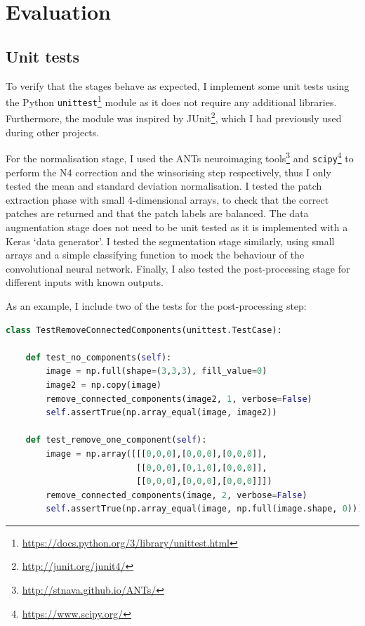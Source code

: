\documentclass[12pt,a4paper,twoside,openright]{report}
\begin{document}
\chapter{Evaluation}

\section{Unit tests}
To verify that the stages behave as expected, I implement some unit tests using the Python \texttt{unittest}\footnote{\url{https://docs.python.org/3/library/unittest.html}} module as it does not require any additional libraries. Furthermore, the module was inspired by JUnit\footnote{\url{http://junit.org/junit4/}}, which I had previously used during other projects.

 For the normalisation stage, I used the ANTs neuroimaging tools\footnote{\url{http://stnava.github.io/ANTs/}} and \texttt{scipy}\footnote{\url{https://www.scipy.org/}} to perform the N4 correction and the winsorising step respectively, thus I only tested the mean and standard deviation normalisation. I tested the patch extraction phase with small 4-dimensional arrays, to check that the correct patches are returned and that the patch labels are balanced. The data augmentation stage does not need to be unit tested as it is implemented with a Keras `data generator'. I tested the segmentation stage similarly, using small arrays and a simple classifying function to mock the behaviour of the convolutional neural network. Finally, I also tested the post-processing stage for different inputs with known outputs.
 
As an example, I include two of the tests for the post-processing step:
\begin{lstlisting}[style=python, language=Python]
	class TestRemoveConnectedComponents(unittest.TestCase):

    def test_no_components(self):
        image = np.full(shape=(3,3,3), fill_value=0)
        image2 = np.copy(image)
        remove_connected_components(image2, 1, verbose=False)
        self.assertTrue(np.array_equal(image, image2))
    
    def test_remove_one_component(self):
        image = np.array([[[0,0,0],[0,0,0],[0,0,0]],
                          [[0,0,0],[0,1,0],[0,0,0]],
                          [[0,0,0],[0,0,0],[0,0,0]]])
        remove_connected_components(image, 2, verbose=False)
        self.assertTrue(np.array_equal(image, np.full(image.shape, 0)))
\end{lstlisting}
\end{document}
